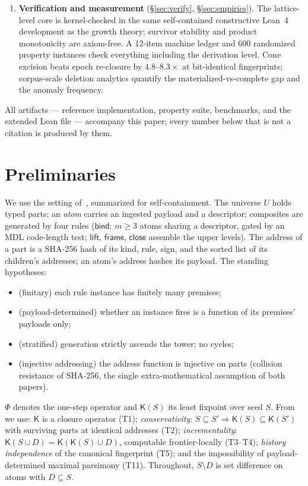 \documentclass[11pt]{article}
\theoremstyle{definition}
\theoremstyle{remark}
\newcommand{\K}{\mathsf{K}}
\newcommand{\diffop}{\setminus}
\newcommand{\sub}{\subseteq}
\begin{document}
\begin{enumerate}[leftmargin=1.4em, itemsep=1pt]
\item \textbf{Verification and measurement} (\S\ref{sec:verify}, \S\ref{sec:empirics}). The lattice-level core is kernel-checked in the same self-contained constructive Lean~4 development as the growth theory; survivor stability and product monotonicity are axiom-free. A 12-item machine ledger and 600 randomized property instances check everything including the derivation level. Cone excision beats epoch re-closure by $4.8$--$8.3\times$ at bit-identical fingerprints; corpus-scale deletion analytics quantify the materialized-vs-complete gap and the anomaly frequency.
\end{enumerate}

All artifacts --- reference implementation, property suite, benchmarks, and the extended Lean file --- accompany this paper; every number below that is not a citation is produced by them.

\section{Preliminaries}\label{sec:prelim}

We use the setting of~\cite{growth}, summarized for self-containment. The universe $U$ holds typed parts; an \emph{atom} carries an ingested payload and a descriptor; composites are generated by four rules ($\mathsf{bind}$: $m \ge 3$ atoms sharing a descriptor, gated by an MDL code-length test; $\mathsf{lift}$, $\mathsf{frame}$, $\mathsf{close}$ assemble the upper levels). The address of a part is a SHA-256 hash of its kind, rule, sign, and the sorted list of its children's addresses; an atom's address hashes its payload. The standing hypotheses:

\begin{itemize}[leftmargin=1.6em, itemsep=0pt]
\item[\textbf{H1}] (finitary) each rule instance has finitely many premises;
\item[\textbf{H2}] (payload-determined) whether an instance fires is a function of its premises' payloads only;
\item[\textbf{H3}] (stratified) generation strictly ascends the tower; no cycles;
\item[\textbf{H4}] (injective addressing) the address function is injective on parts (collision resistance of SHA-256, the single extra-mathematical assumption of both papers).
\end{itemize}

$\Phi$ denotes the one-step operator and $\K(S)$ its least fixpoint over seed $S$. From~\cite{growth} we use: $\K$ is a closure operator (T1); \emph{conservativity}: $S \sub S' \Rightarrow \K(S) \sub \K(S')$ with surviving parts at identical addresses (T2); \emph{incrementality}: $\K(S \cup D) = \K(\K(S) \cup D)$, computable frontier-locally (T3--T4); \emph{history independence} of the canonical fingerprint (T5); and the impossibility of payload-determined maximal parsimony (T11). Throughout, $S \diffop D$ is set difference on atoms with $D \sub S$.
\end{document}
